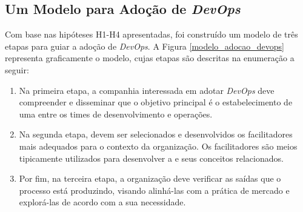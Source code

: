 \subsection{Um Modelo para Adoção de \emph{DevOps}}

Com base nas hipóteses H1-H4 apresentadas, foi construído
um modelo de três etapas para guiar a adoção de {\it DevOps}. A Figura \ref{modelo_adocao_devops}
representa graficamente o modelo, cujas etapas são descritas na enumeração a
seguir:

\begin{enumerate}
\item Na primeira etapa, a companhia interessada em adotar {\it DevOps} deve
compreender e disseminar que o objetivo principal é o estabelecimento de uma
\cc entre os times de desenvolvimento e operações.

\item Na segunda etapa, devem ser selecionados e desenvolvidos os facilitadores
mais adequados para o contexto da organização. Os facilitadores são meios
tipicamente utilizados para desenvolver a \cc e seus conceitos relacionados.

\item Por fim, na terceira etapa, a organização deve verificar as saídas que o
processo está produzindo, visando alinhá-las com a prática de mercado e
explorá-las de acordo com a sua necessidade.

\end{enumerate}

